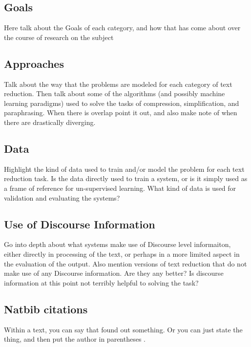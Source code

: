 \subsection{Goals}
{Here talk about the Goals of each category, and how that has come about over the course of research on the subject}

\subsection{Approaches}
{Talk about the way that the problems are modeled for each category of text reduction. Then talk about some of the algorithms (and possibly machine learning paradigms) used to solve the tasks of compression, simplification, and paraphrasing.  When there is overlap point it out, and also make note of when there are drastically diverging. }


\subsection{Data}

{Highlight the kind of data used to train and/or model the problem for each text reduction task. Is the data directly used to train a system, or is it simply used as a frame of reference for un-supervised learning.  What kind of data is used for validation and evaluating the systems? }

\subsection{Use of Discourse Information}
{Go into depth about what systems make use of Discourse level informaiton, either directly in processing of the text, or perhaps in a more limited aspect in the evaluation of the output.  Also mention versions of text reduction that do not make use of any Discourse information.  Are they any better?  Is discourse information at this point not terribly helpful to solving the task?}

\subsection{Natbib citations}
Within a text, you can say that \citet{lin2001} found out something. Or you can just state the thing, and then put the author in parentheses \citep[see][]{szpektor2004}.